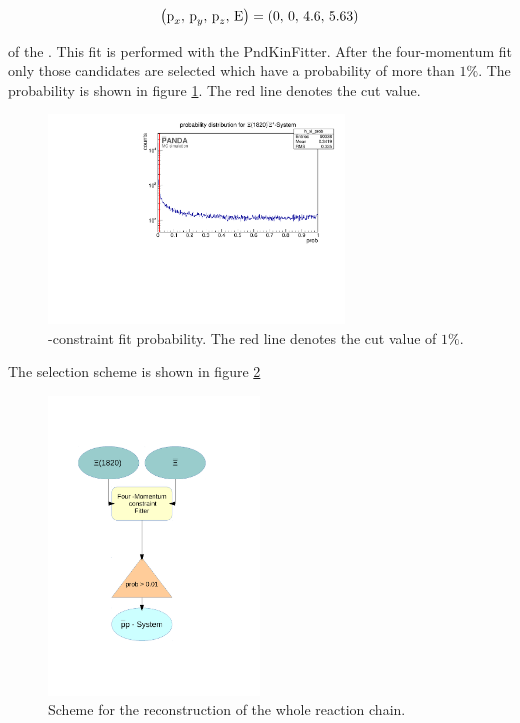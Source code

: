 	\begin{center}
		\begin{equation}\nonumber
			\left(\textnormal{p}_x,\, \textnormal{p}_y,\, \textnormal{p}_z,\, \textnormal{E} \right) = \left(0,\, 0,\, 4.6,\, 5.63 \right)
		\end{equation}
	\end{center}
	of the \pbarpSystem.	
	This fit is performed with the PndKinFitter.
	After the four-momentum fit only those candidates are selected which have a \chisq probability of more than $1\%$.
	The \chisq probability is shown in figure \ref{fig:xisys_prob}. 
	The red line denotes the cut value.

	\begin{figure}
		\centering
		\includegraphics[width=0.7\textwidth]{./plots/pbarp/XiSys_prob.pdf}
		\caption{-constraint fit probability. The red line denotes the cut value of $1\%$.}
		\label{fig:xisys_prob}
	\end{figure}
	
	The selection scheme is shown in figure \ref{fig:fourconstraintfit}
	 
	\begin{figure}
		\centering
			\includegraphics[width=0.50\textwidth]{./plots/combineCascadeSys.pdf}
		\caption{\propose Scheme for the reconstruction of the whole reaction chain.}
		\label{fig:fourconstraintfit}
	\end{figure}
	
